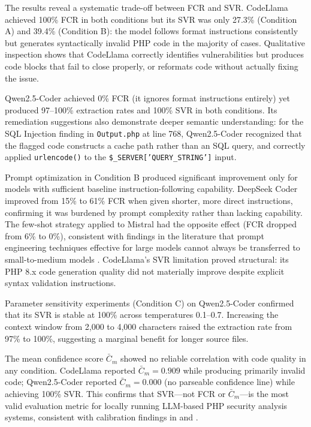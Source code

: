 \documentclass[conference]{IEEEtran}
\begin{document}
The results reveal a systematic trade-off between FCR and SVR.
CodeLlama achieved 100\% FCR in both conditions but its SVR
was only 27.3\% (Condition A) and 39.4\% (Condition B): the
model follows format instructions consistently but generates
syntactically invalid PHP code in the majority of cases.
Qualitative inspection shows that CodeLlama correctly identifies
vulnerabilities but produces code blocks that fail to close
properly, or reformats code without actually fixing the issue.

Qwen2.5-Coder achieved 0\% FCR (it ignores format instructions
entirely) yet produced 97--100\% extraction rates and 100\% SVR
in both conditions. Its remediation suggestions also demonstrate
deeper semantic understanding: for the SQL Injection finding in
\texttt{Output.php} at line 768, Qwen2.5-Coder recognized that
the flagged code constructs a cache path rather than an SQL
query, and correctly applied \texttt{urlencode()} to the
\texttt{\$\_SERVER['QUERY\_STRING']} input.

Prompt optimization in Condition B produced significant
improvement only for models with sufficient baseline
instruction-following capability. DeepSeek Coder improved from
15\% to 61\% FCR when given shorter, more direct instructions,
confirming it was burdened by prompt complexity rather than
lacking capability. The few-shot strategy applied to Mistral
had the opposite effect (FCR dropped from 6\% to 0\%),
consistent with findings in the literature that prompt
engineering techniques effective for large models cannot always
be transferred to small-to-medium models \cite{akuthota2023vulnerability}.
CodeLlama's SVR limitation proved structural: its PHP 8.x code
generation quality did not materially improve despite explicit
syntax validation instructions.

Parameter sensitivity experiments (Condition C) on
Qwen2.5-Coder confirmed that its SVR is stable at 100\% across
temperatures 0.1--0.7. Increasing the context window from 2,000
to 4,000 characters raised the extraction rate from 97\% to
100\%, suggesting a marginal benefit for longer source files.

The mean confidence score $\bar{C}_m$ showed no reliable
correlation with code quality in any condition.
CodeLlama reported $\bar{C}_m = 0.909$ while producing
primarily invalid code; Qwen2.5-Coder reported
$\bar{C}_m = 0.000$ (no parseable confidence line) while
achieving 100\% SVR. This confirms that SVR---not FCR or
$\bar{C}_m$---is the most valid evaluation metric for locally
running LLM-based PHP security analysis systems, consistent
with calibration findings in \cite{akuthota2023vulnerability}
and \cite{yan2025codeif}.
\end{document}
